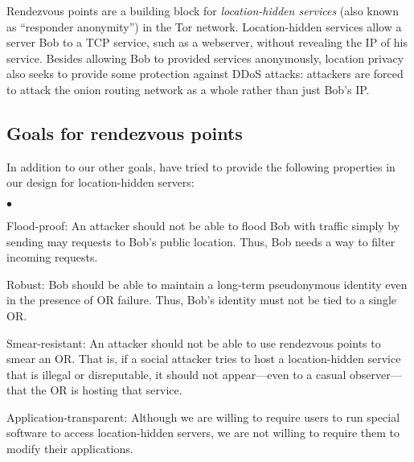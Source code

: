 \documentclass[times,10pt,twocolumn]{article}
\newenvironment{tightlist}{\begin{list}{$\bullet$}{
  \setlength{\itemsep}{0mm}
    \setlength{\parsep}{0mm}
    }}{\end{list}}
\begin{document}


\label{sec:rendezvous}

Rendezvous points are a building block for \emph{location-hidden
services} (also known as ``responder anonymity'') in the Tor
network.  Location-hidden services allow a server Bob to a TCP
service, such as a webserver, without revealing the IP of his service.
Besides allowing Bob to provided services anonymously, location
privacy also seeks to provide some protection against DDoS attacks:
attackers are forced to attack the onion routing network as a whole
rather than just Bob's IP.

\subsection{Goals for rendezvous points}
\label{subsec:rendezvous-goals}
In addition to our other goals, have tried to provide the following
properties in our design for location-hidden servers:
\begin{tightlist}
\item[Flood-proof:] An attacker should not be able to flood Bob with traffic
  simply by sending may requests to Bob's public location.  Thus, Bob needs a
  way to filter incoming requests.
\item[Robust:] Bob should be able to maintain a long-term pseudonymous
  identity even in the presence of OR failure.  Thus, Bob's identity must not
  be tied to a single OR.
\item[Smear-resistant:] An attacker should not be able to use rendezvous
  points to smear an OR.  That is, if a social attacker tries to host a 
  location-hidden service that is illegal or disreputable, it should not
  appear---even to a casual observer---that the OR is hosting that service.
\item[Application-transparent:] Although we are willing to require users to
  run special software to access location-hidden servers, we are not willing
  to require them to modify their applications.
\end{tightlist}
\end{document}
